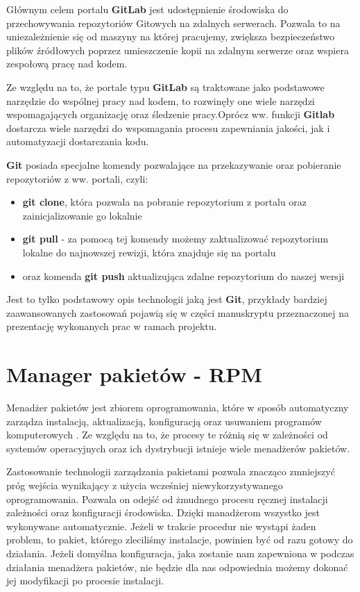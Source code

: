 Głównym celem portalu \textbf{GitLab} jest udostępnienie środowiska do przechowywania repozytoriów Gitowych na zdalnych serwerach. Pozwala to na uniezależnienie się od maszyny na której pracujemy, zwiększa bezpieczeństwo plików źródłowych poprzez umieszczenie kopii na zdalnym serwerze oraz wspiera zespołową pracę nad kodem.\par

Ze względu na to, że portale typu \textbf{GitLab} są traktowane jako podstawowe narzędzie do wspólnej pracy nad kodem, to rozwinęły one wiele narzędzi wspomagających organizację oraz śledzenie pracy.Oprócz ww. funkcji \textbf{Gitlab} dostarcza wiele narzędzi do wspomagania procesu zapewniania jakości, jak i automatyzacji dostarczania kodu.\par

\textbf{Git} posiada specjalne komendy pozwalające na przekazywanie oraz pobieranie repozytoriów z ww. portali, czyli:
\begin{itemize}
\item \textbf{git clone}, która pozwala na pobranie repozytorium z portalu oraz zainicjalizowanie go lokalnie
\item \textbf{git pull} - za pomocą tej komendy możemy zaktualizować repozytorium lokalne do najnowszej rewizji, która znajduje się na portalu
\item oraz komenda \textbf{git push} aktualizująca zdalne repozytorium do naszej wersji
\end{itemize}

Jest to tylko podstawowy opis technologii jaką jest \textbf{Git}, przykłady bardziej zaawansowanych zastosowań pojawią się w części manuskryptu przeznaczonej na prezentację wykonanych prac w ramach projektu.


\section{Manager pakietów - RPM}
Menadżer pakietów jest zbiorem oprogramowania, które w sposób automatyczny zarządza instalacją, aktualizacją, konfiguracją oraz usuwaniem programów komputerowych \cite{ManagerWiki}. Ze względu na to, że procesy te różnią się w zależności od systemów operacyjnych oraz ich dystrybucji istnieje wiele menadżerów pakietów.\par

Zastosowanie technologii zarządzania pakietami pozwala znacząco zmniejszyć próg wejścia wynikający z użycia wcześniej niewykorzystywanego oprogramowania. Pozwala on odejść od żmudnego procesu ręcznej instalacji zależności oraz konfiguracji środowiska. Dzięki manadżerom wszystko jest wykonywane automatycznie. Jeżeli w trakcie procedur nie wystąpi żaden problem, to pakiet, którego zleciliśmy instalacje, powinien być od razu gotowy do działania. Jeżeli domyślna konfiguracja, jaka zostanie nam zapewniona w podczas działania menadżera pakietów, nie będzie dla nas odpowiednia możemy dokonać jej modyfikacji po procesie instalacji.

